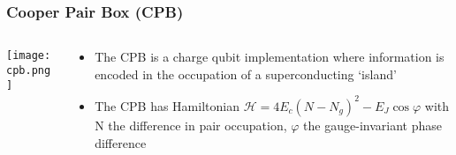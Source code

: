 \documentclass{beamer}
\begin{document}
\begin{frame}
    \frametitle{Cooper Pair Box (CPB)}

    \begin{columns}[c]
        \begin{column}{0.4\linewidth}
            \texttt{[image: cpb.png]}
        \end{column}
        \begin{column}{0.6\linewidth}
            \begin{itemize}

                \item The CPB is a charge qubit implementation where 
                    information is encoded in the occupation of a 
                    superconducting `island'

                \item The CPB has Hamiltonian 
                    $
                    \mathscr{H} = 4 E_c \left(N - N_g\right)^2 
                    - E_J \cos \varphi
                    $
                    with N the difference in pair occupation, 
                    $\varphi$ the gauge-invariant phase difference
                
            \end{itemize}
        \end{column}
    \end{columns}

\end{frame}
\end{document}
